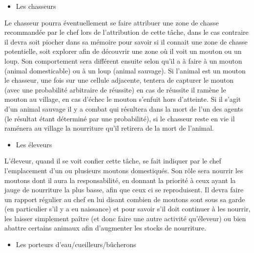 \documentclass[12pt]{article}
\begin{document}
		\begin{itemize}
		\item Les chasseurs\\
		\end{itemize}

Le chasseur pourra éventuellement se faire attribuer une zone de chasse 
recommandée par le chef lors de l'attribution de cette tâche, dans le cas 
contraire il devra soit piocher dans sa mémoire pour savoir si il connait 
une zone de chasse potentielle, soit explorer afin de découvrir une zone 
où il voit un mouton ou un loup. Son comportement sera différent ensuite selon 
qu'il a à faire à un mouton (animal domesticable) ou à un loup (animal sauvage).
Si l'animal est un mouton le chasseur, une fois sur une cellule adjacente,
tentera de capturer le mouton (avec une probabilité arbitraire de réussite) en 
cas de réussite il ramène le mouton au village, en cas d'échec le mouton 
s'enfuit hors d'atteinte. Si il s'agit d'un animal sauvage il y a combat qui 
résultera dans la mort de l'un des agents (le résultat étant déterminé par une 
probabilité), si le chasseur reste en vie il raménera au village la nourriture 
qu'il retirera de la mort de l'animal.\\

		\begin{itemize}
		\item Les éleveurs\\
		\end{itemize}

L'éleveur, quand il se voit confier cette tâche, se fait indiquer par le chef 
l'emplacement d'un ou plusieurs moutons domestiqués. Son rôle sera nourrir les 
moutons dont il aura la responsabilité, en donnant la priorité à ceux ayant la 
jauge de nourriture la plus basse, afin que ceux ci se reproduisent. Il devra 
faire un rapport régulier au chef en lui disant combien de moutons sont sous 
sa garde (en particulier s'il y a eu naissance) et pour savoir s'il doit 
continuer à les nourrir, les laisser simplement paître (et donc faire une 
autre activité qu'éleveur) ou bien abattre certains animaux afin d'augmenter 
les stocks de nourriture.\\

		\begin{itemize}
		\item Les porteurs d'eau/cueilleurs/bûcherons\\
		\end{itemize}
\end{document}

